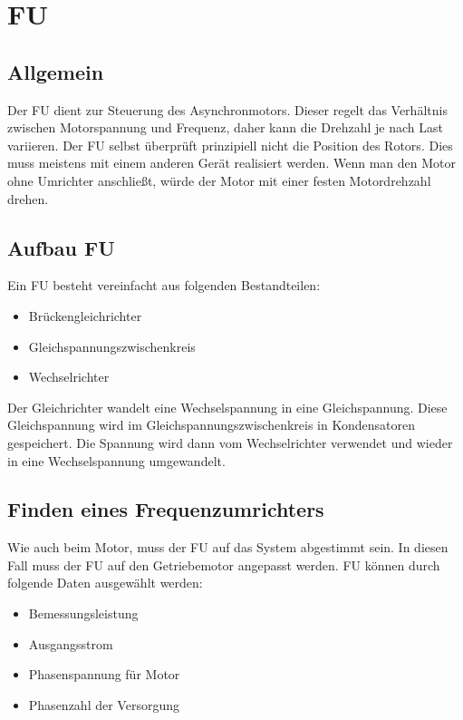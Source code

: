 \section{\acl{FU}}
\label{sec:frequenzumrichter}

\subsection{Allgemein}
\label{sec:allgemeinfrequenzumrichter}

Der \ac{FU} dient zur Steuerung des Asynchronmotors. Dieser regelt das Verhältnis zwischen Motorspannung und Frequenz, daher kann die Drehzahl je nach Last variieren. Der \ac{FU} selbst überprüft prinzipiell nicht die Position des Rotors. Dies muss meistens mit einem anderen Gerät realisiert werden. Wenn man den Motor ohne Umrichter anschließt, würde der Motor mit einer festen Motordrehzahl drehen. 

\subsection{Aufbau \acl{FU}}
\label{sec:aufbauFrequenzumrichter}

Ein \ac{FU} besteht vereinfacht aus folgenden Bestandteilen:

\begin{itemize}
	\item{Brückengleichrichter} %
	\item{Gleichspannungszwischenkreis}
	\item{Wechselrichter}
\end{itemize}

Der Gleichrichter wandelt eine Wechselspannung in eine Gleichspannung. Diese Gleichspannung wird im Gleichspannungszwischenkreis in Kondensatoren gespeichert. Die Spannung wird dann vom Wechselrichter verwendet und wieder in eine Wechselspannung umgewandelt.

\subsection{Finden eines Frequenzumrichters}
\label{sec:findenEinesFrequenzumrichter}

Wie auch beim Motor, muss der \ac{FU} auf das System abgestimmt sein. In diesen Fall muss der \ac{FU} auf den Getriebemotor angepasst werden. \ac{FU} können durch folgende Daten ausgewählt werden:

\begin{itemize}
	\item{Bemessungsleistung}
	\item{Ausgangsstrom}
	\item{Phasenspannung für Motor}
	\item{Phasenzahl der Versorgung}
\end{itemize}


